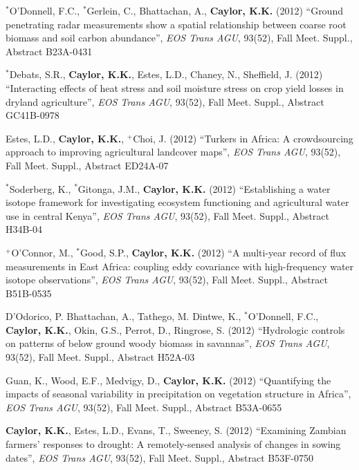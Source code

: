 \documentclass[10pt]{article}
\begin{document}
\begin{etaremune}
\item $^{*}$O'Donnell, F.C., $^{*}$Gerlein, C., Bhattachan, A., \textbf{Caylor, K.K.} (2012) ``Ground penetrating radar measurements show a spatial relationship between coarse root biomass and soil carbon abundance'', \emph{EOS Trans AGU}, 93(52), Fall Meet. Suppl., Abstract B23A-0431

\item $^{*}$Debats, S.R., \textbf{Caylor, K.K.}, Estes, L.D., Chaney, N., Sheffield, J. (2012) ``Interacting effects of heat stress and soil moisture stress on crop yield losses in dryland agriculture'', \emph{EOS Trans AGU}, 93(52), Fall Meet. Suppl., Abstract GC41B-0978

\item Estes, L.D., \textbf{Caylor, K.K.}, $^{+}$Choi, J. (2012) ``Turkers in Africa: A crowdsourcing approach to improving agricultural landcover maps'', \emph{EOS Trans AGU}, 93(52), Fall Meet. Suppl., Abstract ED24A-07

\item $^{*}$Soderberg, K., $^{*}$Gitonga, J.M., \textbf{Caylor, K.K.} (2012) ``Establishing a water isotope framework for investigating ecosystem functioning and agricultural water use in central Kenya'', \emph{EOS Trans AGU}, 93(52), Fall Meet. Suppl., Abstract H34B-04

\item $^{+}$O'Connor, M., $^{*}$Good, S.P., \textbf{Caylor, K.K.} (2012) ``A multi-year record of flux measurements in East Africa: coupling eddy covariance with high-frequency water isotope observations'', \emph{EOS Trans AGU}, 93(52), Fall Meet. Suppl., Abstract B51B-0535

\item D'Odorico, P. Bhattachan, A., Tathego, M. Dintwe, K., $^{*}$O'Donnell, F.C., \textbf{Caylor, K.K.}, Okin, G.S., Perrot, D., Ringrose, S. (2012) ``Hydrologic controls on patterns of below ground woody biomass in savannas'', \emph{EOS Trans AGU}, 93(52), Fall Meet. Suppl., Abstract H52A-03 

\item Guan, K., Wood, E.F., Medvigy, D., \textbf{Caylor, K.K.} (2012) ``Quantifying the impacts of seasonal variability in precipitation on vegetation structure in Africa'', \emph{EOS Trans AGU}, 93(52), Fall Meet. Suppl., Abstract B53A-0655

\item \textbf{Caylor, K.K.}, Estes, L.D., Evans, T., Sweeney, S. (2012) ``Examining Zambian farmers' responses to drought: A remotely-sensed analysis of changes in sowing dates'', \emph{EOS Trans AGU}, 93(52), Fall Meet. Suppl., Abstract B53F-0750


\end{etaremune}
\end{document}
